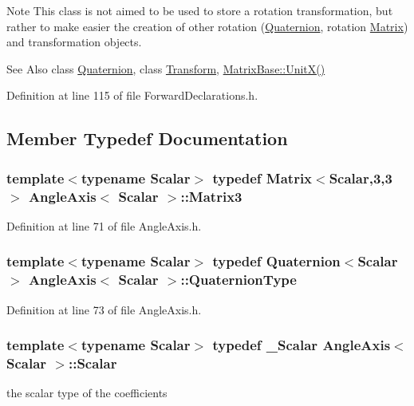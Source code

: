 \begin{DoxyNote}{Note}
This class is not aimed to be used to store a rotation transformation, but rather to make easier the creation of other rotation (\hyperlink{class_quaternion}{Quaternion}, rotation \hyperlink{class_matrix}{Matrix}) and transformation objects.
\end{DoxyNote}
\begin{DoxySeeAlso}{See Also}
class \hyperlink{class_quaternion}{Quaternion}, class \hyperlink{class_transform}{Transform}, \hyperlink{class_matrix_base_a1c268f62db2c09d4c8ae7d74d5d65619}{Matrix\-Base\-::\-Unit\-X()} 
\end{DoxySeeAlso}


Definition at line 115 of file Forward\-Declarations.\-h.



\subsection{Member Typedef Documentation}
\hypertarget{class_angle_axis_a6f1c9f87a9dccd91fc397e4e007f3668}{
\subsubsection[{Matrix3}]{\setlength{\rightskip}{0pt plus 5cm}template$<$typename Scalar$>$ typedef {\bf Matrix}$<${\bf Scalar},3,3$>$ {\bf Angle\-Axis}$<$ {\bf Scalar} $>$\-::{\bf Matrix3}}}\label{class_angle_axis_a6f1c9f87a9dccd91fc397e4e007f3668}


Definition at line 71 of file Angle\-Axis.\-h.

\hypertarget{class_angle_axis_af3a8449f8ac6c99fa33cac3f390e97f4}{
\subsubsection[{Quaternion\-Type}]{\setlength{\rightskip}{0pt plus 5cm}template$<$typename Scalar$>$ typedef {\bf Quaternion}$<${\bf Scalar}$>$ {\bf Angle\-Axis}$<$ {\bf Scalar} $>$\-::{\bf Quaternion\-Type}}}\label{class_angle_axis_af3a8449f8ac6c99fa33cac3f390e97f4}


Definition at line 73 of file Angle\-Axis.\-h.

\hypertarget{class_angle_axis_a6b92671c4ba67e688117dfb93215a895}{
\subsubsection[{Scalar}]{\setlength{\rightskip}{0pt plus 5cm}template$<$typename Scalar$>$ typedef \-\_\-\-Scalar {\bf Angle\-Axis}$<$ {\bf Scalar} $>$\-::{\bf Scalar}}}\label{class_angle_axis_a6b92671c4ba67e688117dfb93215a895}
the scalar type of the coefficients 

